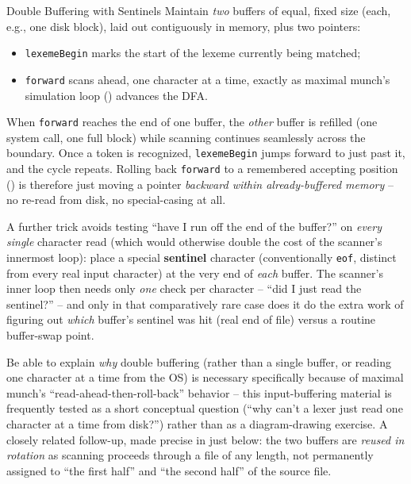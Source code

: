 \documentclass[full-course-notes.tex]{subfiles}
\begin{document}
\begin{defbox}{Double Buffering with Sentinels}
Maintain \emph{two} buffers of equal, fixed size (each, e.g., one disk block), laid out
contiguously in memory, plus two pointers:
\begin{itemize}
  \item \texttt{lexemeBegin} marks the start of the lexeme currently being matched;
  \item \texttt{forward} scans ahead, one character at a time, exactly as maximal munch's
  simulation loop () advances the DFA.
\end{itemize}
When \texttt{forward} reaches the end of one buffer, the \emph{other} buffer is refilled (one
system call, one full block) while scanning continues seamlessly across the boundary. Once a
token is recognized, \texttt{lexemeBegin} jumps forward to just past it, and the cycle repeats.
Rolling back \texttt{forward} to a remembered accepting position ()
is therefore just moving a pointer \emph{backward within already-buffered memory} -- no re-read
from disk, no special-casing at all.
\end{defbox}

A further trick avoids testing ``have I run off the end of the buffer?'' on \emph{every single}
character read (which would otherwise double the cost of the scanner's innermost loop): place a
special \textbf{sentinel} character (conventionally \texttt{eof}, distinct from every real input
character) at the very end of \emph{each} buffer. The scanner's inner loop then needs only
\emph{one} check per character -- ``did I just read the sentinel?'' -- and only in that
comparatively rare case does it do the extra work of figuring out \emph{which} buffer's sentinel
was hit (real end of file) versus a routine buffer-swap point.

\begin{examfocus}
Be able to explain \emph{why} double buffering (rather than a single buffer, or reading one
character at a time from the OS) is necessary specifically because of maximal munch's
``read-ahead-then-roll-back'' behavior -- this input-buffering material is frequently tested as
a short conceptual question (``why can't a lexer just read one character at a time from disk?'')
rather than as a diagram-drawing exercise. A closely related follow-up, made precise in
 just below: the two buffers are \emph{reused in rotation} as
scanning proceeds through a file of any length, not permanently assigned to ``the first half''
and ``the second half'' of the source file.
\end{examfocus}
\end{document}
